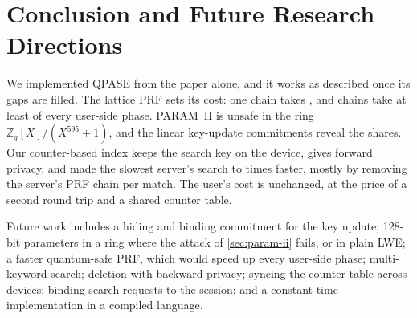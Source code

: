 \section{Conclusion and Future Research Directions}
\label{sec:conclusion}

We implemented QPASE from the paper alone, and it works as described once its gaps are filled. The lattice PRF sets
its cost: one chain takes \AxMedian{}, and chains take at least \ChainShareMin{} of every user-side phase. PARAM~II
is unsafe in the ring $\mathbb{Z}_q[X]/(X^{595}+1)$, and the linear key-update commitments reveal the shares. Our
counter-based index keeps the search key on the device, gives forward privacy, and made the slowest server's search
\ScalingSpeedupMin{} to \ScalingSpeedupMax{} times faster, mostly by removing the server's PRF chain per match. The
user's cost is unchanged, at the price of a second round trip and a shared counter table.

Future work includes a hiding and binding commitment for the key update; 128-bit parameters in a ring where the
attack of \cref{sec:param-ii} fails, or in plain LWE; a faster quantum-safe PRF, which would speed up every
user-side phase; multi-keyword search; deletion with backward privacy; syncing the counter table across devices;
binding search requests to the session; and a constant-time implementation in a compiled language.

